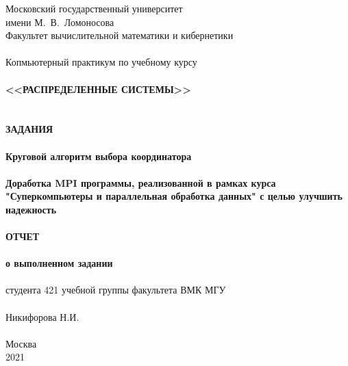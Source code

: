 \documentclass[a4peper, 12pt, titlepage, finall]{extreport}
\begin{document}
\begin{titlepage}
    \begin{center}
	{\small \sc Московский государственный университет \\имени М.~В.~Ломоносова\\
	Факультет вычислительной математики и кибернетики\\}
	\vfill
	~\\
	{\Large Копмьютерный практикум по учебному курсу}\\
	~\\
	{\large \bf \sc <<РАСПРЕДЕЛЕННЫЕ СИСТЕМЫ>>}\\ 
	~\\
	~\\
	{\large \bf \sc ЗАДАНИЯ}\\
	~\\
	{\large \bf Круговой алгоритм выбора координатора}
	~\\
	~\\
	{\large \bf Доработка MPI программы, реализованной в рамках курса "Суперкомпьютеры и параллельная обработка данных" с целью улучшить надежность}
	~\\
	~\\
	{\large \bf \sc ОТЧЕТ}\\
	~\\
	{\large \bf о выполненном задании}\\
	~\\
	{\large студента 421 учебной группы факультета ВМК МГУ}\\
	~\\
	{\large Никифорова Н.И.}\\
	~\\
	\vfill
	{\small Москва\\2021}
    \end{center}
\end{titlepage}
\end{document}
